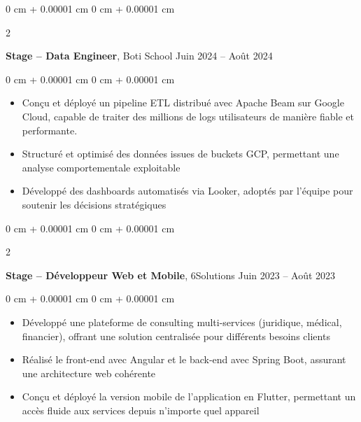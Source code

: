\documentclass[10pt, letterpaper]{article}
\newenvironment{highlights}{
    \begin{itemize}[
        topsep=0.10 cm,
        parsep=0.10 cm,
        partopsep=0pt,
        itemsep=0pt,
        leftmargin=0 cm + 10pt
    ]
}{
    \end{itemize}
} %
\newenvironment{onecolentry}{
    \begin{adjustwidth}{
        0 cm + 0.00001 cm
    }{
        0 cm + 0.00001 cm
    }
}{
    \end{adjustwidth}
} %
\newenvironment{twocolentry}[2][]{
    \onecolentry
    \def\secondColumn{#2}
    \setcolumnwidth{\fill, 4.5 cm}
    \begin{paracol}{2}
}{
    \switchcolumn \raggedleft \secondColumn
    \end{paracol}
    \endonecolentry
} %
\begin{document}
        \begin{twocolentry}{
            Juin 2024 – Août 2024
        }
            \textbf{Stage – Data Engineer}, Boti School \end{twocolentry}

        \vspace{0.10 cm}
        \begin{onecolentry}
            \begin{highlights}
                \item Conçu et déployé un pipeline ETL distribué avec Apache Beam sur Google Cloud, capable de traiter des millions de logs utilisateurs de manière fiable et performante.  
                \item Structuré et optimisé des données issues de buckets GCP, permettant une analyse comportementale exploitable
                \item Développé des dashboards automatisés via Looker, adoptés par l’équipe pour soutenir les décisions stratégiques
                
            \end{highlights}
        \end{onecolentry}



        \vspace{0.2 cm}

        \begin{twocolentry}{
            Juin 2023 – Août 2023
        }
            \textbf{Stage – Développeur Web et Mobile}, 6Solutions\end{twocolentry}

        \vspace{0.10 cm}
        \begin{onecolentry}
            \begin{highlights}
                \item Développé une plateforme de consulting multi-services (juridique, médical, financier), offrant une solution centralisée pour différents besoins clients 
                \item Réalisé le front-end avec Angular et le back-end avec Spring Boot, assurant une architecture web cohérente
                \item Conçu et déployé la version mobile de l’application en Flutter, permettant un accès fluide aux services depuis n’importe quel appareil
    
            \end{highlights}
        \end{onecolentry}
\end{document}
